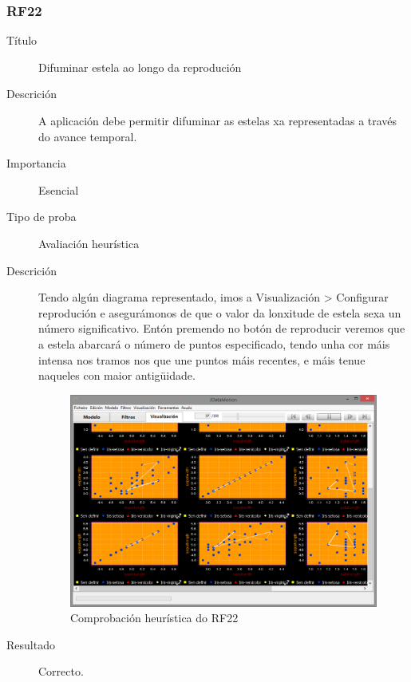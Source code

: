 \subsubsection*{RF22}
\begin{description}
\item[Título] \hfill
Difuminar estela ao longo da reprodución
\item[Descrición] \hfill
A aplicación debe permitir difuminar as estelas xa representadas a través do avance temporal.
\item[Importancia] \hfill
Esencial
\item[Tipo de proba] \hfill
Avaliación heurística
\item[Descrición]
Tendo algún diagrama representado, imos a Visualización \textgreater{} Configurar reprodución e asegurámonos de que o valor da lonxitude de estela sexa un número significativo. Entón premendo no botón de reproducir veremos que a estela abarcará o número de puntos especificado, tendo unha cor máis intensa nos tramos nos que une puntos máis recentes, e máis tenue naqueles con maior antigüidade.
\begin{figure}
\centering
\includegraphics[width=\textwidth,height=\textheight,keepaspectratio]{figuras/RF202122}
\caption{Comprobación heurística do RF22}
\label{RF202122}
\end{figure}
\item[Resultado]
Correcto.
\end{description}

